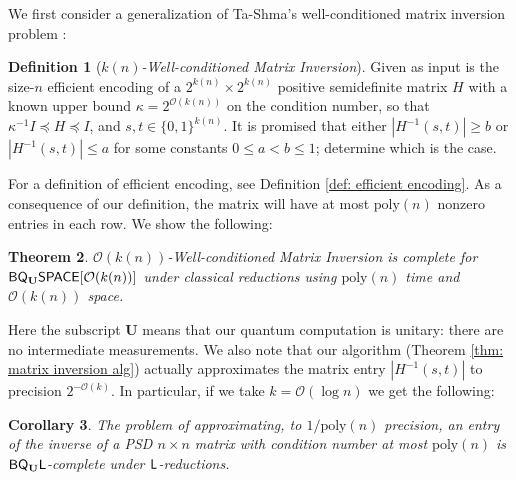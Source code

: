 \documentclass[11pt]{article}
\newtheorem{theorem}{Theorem}
\newtheorem{corollary}[theorem]{Corollary}
\theoremstyle{definition}
\newtheorem{definition}[theorem]{Definition}
\theoremstyle{remark}
\newcommand\Logspace{{\sf{L}}}
\newcommand\matrixinvert[1]{{\ensuremath{#1}}\textit{-Well-conditioned Matrix Inversion}}
\newcommand{\classfont}{\sf}
\newcommand{\Unitary}{\mathbf{U}}
\newcommand{\unitaryBQL}{{\classfont{BQ}_\Unitary\classfont{L}}}
\newcommand{\unitaryBQSPACE}[1]{{\classfont{BQ}_\Unitary\classfont{SPACE}}[#1]}
\newcommand\bigoh{\mathcal{O}}
\newcommand{\poly}{\textrm{poly}}
\begin{document}
We first consider a generalization of Ta-Shma's well-conditioned matrix inversion problem \cite{tashma}:\begin{definition}[\matrixinvert{k(n)}] \label{def: matrix invert}
Given as input is the size-$n$ efficient encoding of a $2^{k(n)} \times 2^{k(n)}$ positive semidefinite matrix $H$ with a known upper bound $\kappa = 2^{\mathcal{O}(k(n))}$ on the condition number, so that $\kappa^{-1}I\preceq H \preceq I$, and $s,t\in \lbrace 0,1\rbrace^{k(n)}$. It is promised that either $|H^{-1}(s,t)|\geq b$
 or $|H^{-1}(s,t)|\leq a$ for some constants $0 \le a < b \le 1$; determine which is the case.
 \end{definition}
For a definition of efficient encoding, see Definition \ref{def: efficient encoding}. As a consequence of our definition, the matrix will have at most $\poly(n)$ nonzero entries in each row.
We show the following:
\begin{theorem} \label{thm: matrix invert}
\matrixinvert{\mathcal{O}(k(n))} is complete for $\unitaryBQSPACE{\mathcal{O}(k(n))}$ under classical reductions using $\poly(n)$ time and $\mathcal{O}(k(n))$ space.
\end{theorem}

Here the subscript $\Unitary$ means that our quantum computation is unitary: there are no intermediate measurements. We also note that our algorithm (Theorem \ref{thm: matrix inversion alg}) actually approximates the matrix entry $|H^{-1}(s,t)|$ to precision $2^{-\mathcal{O}(k)}$. In particular, if we take $k = \bigoh(\log n)$ we get the following:
\begin{corollary}
The problem of approximating, to $1/\poly(n)$ precision, an entry of the inverse of a PSD $n \times n$ matrix with condition number at most $\poly(n)$ is $\unitaryBQL$-complete under $\Logspace$-reductions.
\end{corollary}
\end{document}
